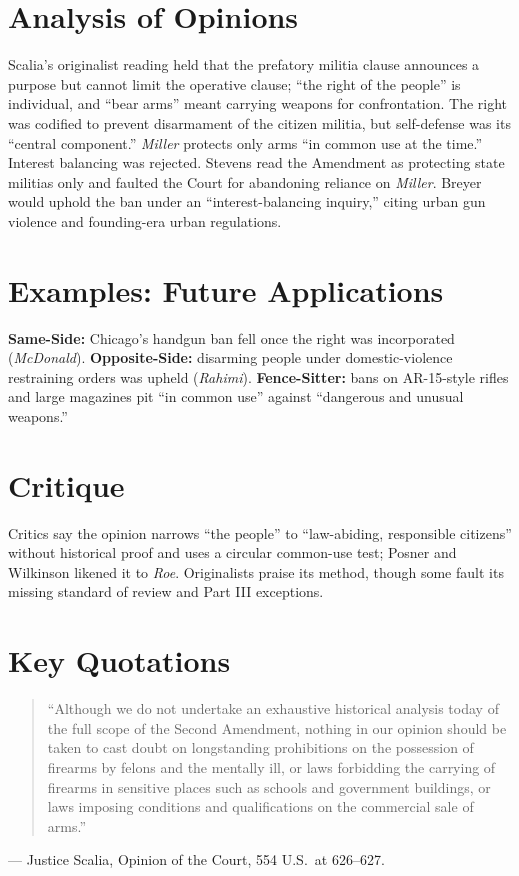 \documentclass[12pt]{article}
\begin{document}
\section{Analysis of Opinions}
Scalia's originalist reading held that the prefatory militia clause announces a purpose but cannot limit the operative clause; ``the right of the people'' is individual, and ``bear arms'' meant carrying weapons for confrontation. The right was codified to prevent disarmament of the citizen militia, but self-defense was its ``central component.'' \textit{Miller} protects only arms ``in common use at the time.'' Interest balancing was rejected. Stevens read the Amendment as protecting state militias only and faulted the Court for abandoning reliance on \textit{Miller}. Breyer would uphold the ban under an ``interest-balancing inquiry,'' citing urban gun violence and founding-era urban regulations.

\section{Examples: Future Applications}
\textbf{Same-Side:} Chicago's handgun ban fell once the right was incorporated (\textit{McDonald}). \textbf{Opposite-Side:} disarming people under domestic-violence restraining orders was upheld (\textit{Rahimi}). \textbf{Fence-Sitter:} bans on AR-15-style rifles and large magazines pit ``in common use'' against ``dangerous and unusual weapons.''

\section{Critique}
Critics say the opinion narrows ``the people'' to ``law-abiding, responsible citizens'' without historical proof and uses a circular common-use test; Posner and Wilkinson likened it to \textit{Roe}. Originalists praise its method, though some fault its missing standard of review and Part III exceptions.

\section{Key Quotations}
\begin{quote}
``Although we do not undertake an exhaustive historical analysis today of the full scope of the Second Amendment, nothing in our opinion should be taken to cast doubt on longstanding prohibitions on the possession of firearms by felons and the mentally ill, or laws forbidding the carrying of firearms in sensitive places such as schools and government buildings, or laws imposing conditions and qualifications on the commercial sale of arms.''
\end{quote}
\noindent --- Justice Scalia, Opinion of the Court, 554 U.S.\ at 626--627.
\end{document}
